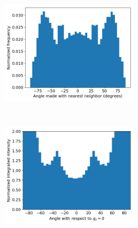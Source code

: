 \documentclass{article}
\begin{document}
  \begin{figure}[!htb]
  \centering
	\begin{subfigure}{\linewidth}
	\centering
		\begin{subfigure}{0.45\textwidth}
	        \centering
		        \includegraphics[width=\linewidth]{angles_traj_layered.png}
		        \caption{}~\label{fig:layered_tails}
		\end{subfigure}
		\begin{subfigure}{0.45\textwidth}
        	\centering
		        \includegraphics[width=\linewidth]{layered_angle_v_I.png}
		        \caption{}~\label{fig:layered_integration}

\end{subfigure}
\end{subfigure}
\end{figure}
\end{document}
